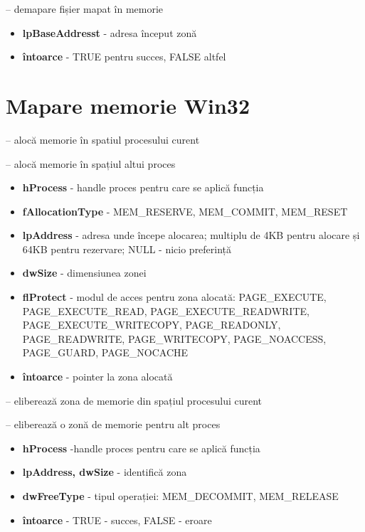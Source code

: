 \documentclass{refcard.cs.pub.ro}
\begin{document}
\begin{multicols*}{3}
 -- demapare fișier mapat în memorie
\begin{itemize}
\item \textbf{lpBaseAddresst} - adresa început zonă
\item \textbf{întoarce} - TRUE pentru succes, FALSE altfel
\end{itemize}

\section{Mapare memorie Win32}

 -- alocă memorie în spatiul procesului curent

 -- alocă memorie în spațiul altui proces
\begin{itemize}
\item \textbf{hProcess} - handle proces pentru care se aplică funcția
\item \textbf{fAllocationType} - MEM_RESERVE, MEM_COMMIT, MEM_RESET
\item \textbf{lpAddress} - adresa unde începe alocarea; multiplu de 4KB
pentru alocare și 64KB pentru rezervare; NULL - nicio preferință
\item \textbf{dwSize} - dimensiunea zonei
\item \textbf{flProtect} - modul de acces pentru zona alocată:
PAGE_EXECUTE, PAGE_EXECUTE_READ, PAGE_EXECUTE_READWRITE,
PAGE_EXECUTE_WRITECOPY, PAGE_READONLY, PAGE_READWRITE, PAGE_WRITECOPY,
PAGE_NOACCESS, PAGE_GUARD, PAGE_NOCACHE
\item \textbf{întoarce} - pointer la zona alocată
\end{itemize}

\pagebreak

 -- eliberează zona de memorie din spațiul procesului curent

 -- eliberează o zonă de memorie pentru alt proces
\begin{itemize}
\item \textbf{hProcess} -handle proces pentru care se aplică funcția
\item \textbf{lpAddress, dwSize} - identifică zona
\item \textbf{dwFreeType} - tipul operației: MEM_DECOMMIT, MEM_RELEASE
\item \textbf{întoarce} - TRUE - succes, FALSE - eroare
\end{itemize}


\end{multicols*}
\end{document}
